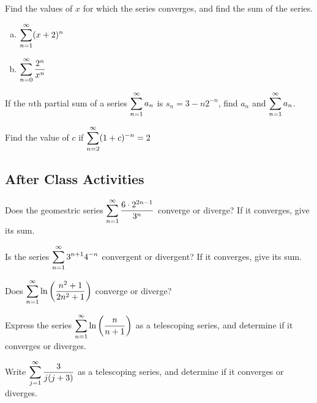 \documentclass[notes]{subfiles}
\begin{document}
		\begin{ex}
			Find the values of $x$ for which the series converges, and find the sum of the series.
			\begin{enumerate}[(a)]
				\item $\displaystyle \sum_{n =1 }^\infty (x+2)^n$
					
				\item $\displaystyle \sum_{n = 0}^\infty \dfrac{2^n}{x^n}$
			\end{enumerate}
		\end{ex}
		
		\begin{ex}
			If the $n$th partial sum of a series $\displaystyle \sum_{n = 1}^\infty a_n$ is $s_n = 3-n2^{-n}$, find $a_n$ and $\displaystyle \sum_{n = 1}^\infty a_n$.
		\end{ex}
			\vs{1}
			
		\begin{ex}
			Find the value of $c$ if $\displaystyle \sum_{n = 2}^\infty (1 + c)^{-n} = 2$
		\end{ex}
			\newpage
			
	\subsection*{After Class Activities}
		\begin{ex}
			Does the geomestric series $\displaystyle \sum_{n = 1}^\infty \dfrac{6\cdot 2^{2n-1}}{3^n}$ converge or diverge?  If it converges, give its sum.
		\end{ex}
			
		\begin{ex}
			Is the series $\displaystyle \sum_{n = 1}^\infty 3^{n+1}4^{-n}$ convergent or divergent?  If it converges, give its sum.
		\end{ex}	
			\vs{1}
			
		\begin{ex}
			Does $\displaystyle \sum_{n =1 }^\infty \ln \left( \dfrac{n^2+1}{2n^2+1}\right)$ converge or diverge?
		\end{ex}	
			\vs{1}
			
		\begin{ex}
			Express the series $\displaystyle \sum_{n = 1}^\infty \ln\left( \dfrac{n}{n+1}\right)$ as a telescoping series, and determine if it converges or diverges.
		\end{ex}
			\vs{1}
			\newpage
			
		\begin{ex}
			Write $\displaystyle \sum_{j = 1}^\infty \dfrac{3}{j(j+3)}$ as a telescoping series, and determine if it converges or diverges.
		\end{ex}
			
\end{document}
